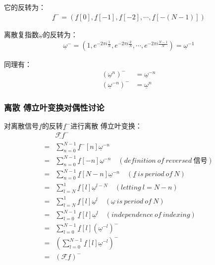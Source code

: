 它的反转为：
\begin{align*}
	\underline{f}^- = \left( \underline{f}[0],\underline{f}[-1],\underline{f}[-2], \cdots ,\underline{f}[-(N-1)] \right)
\end{align*}

离散复指数$\underline{\omega}$的反转为：
\begin{align*}
	\underline{\omega}^- = \left( 1,e^{-2\pi i\frac{1}{N}},e^{-2\pi i\frac{2}{N}},\cdots,e^{-2\pi i\frac{N-1}{N}} \right) = \underline{\omega}^{-1}
\end{align*}

同理有：
\begin{align*}
	\left(\underline{\omega}^n \right)^-    & = \underline{\omega}^{-n} \\
	\left(\underline{\omega}^{-n} \right)^- & = \underline{\omega}^{n}
\end{align*}
\subsubsection{离散 傅立叶变换对偶性讨论}
对离散信号$\underline{f}$的反转$\underline{f}^-$进行离散 傅立叶变换：
\begin{align*}
	  & \underline{\mathcal{F}f}^-                                                                                \\
	= & \sum_{n=0}^{N-1}\underline{f}^-[n]\underline{\omega}^{-n}                                                 \\
	= & \sum_{n=0}^{N-1}\underline{f}[-n]\underline{\omega}^{-n}    \quad (definition\ of\ reversed\ 信号)        \\
	= & \sum_{n=0}^{N-1}\underline{f}[N-n]\underline{\omega}^{-n}   \quad (\underline{f}\ is\ period\ of\ N)      \\
	= & \sum_{l=N}^1\underline{f}[l]\underline{\omega}^{l-N}        \quad (letting\ l=N-n)                        \\
	= & \sum_{l=N}^1\underline{f}[l]\underline{\omega}^l            \quad (\underline{\omega}\ is\ period\ of\ N) \\
	= & \sum_{l=0}^{N-1}\underline{f}[l]\underline{\omega}^l        \quad (independence\ of\ indexing)            \\
	= & \sum_{l=0}^{N-1}\underline{f}[l](\underline{\omega}^{-l})^-                                               \\
	= & \left(
	\sum_{l=0}^{N-1}\underline{f}[l]\underline{\omega}^{-l} \right )^-                                            \\
	= & \left(\underline{\mathcal{F}f}\right )^-
\end{align*}

